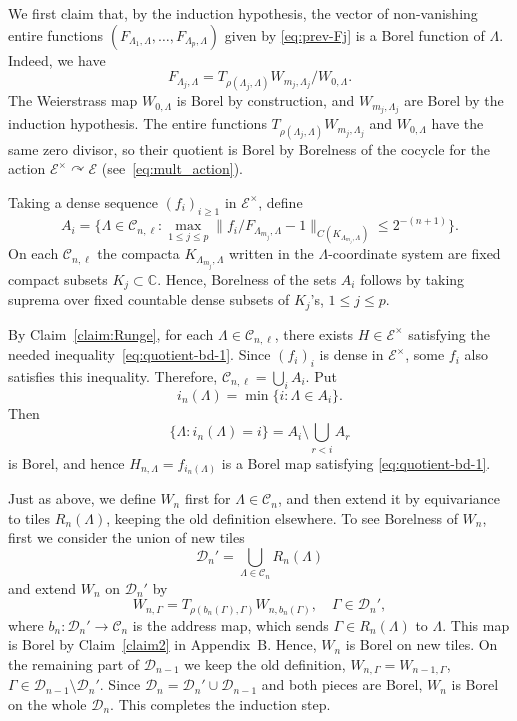 \documentclass[11pt]{paper}
\newcommand{\bC}{\mathbb C}
\newcommand{\cE}{\mathcal E}
\newcommand{\cD}{\mathcal D}
\newcommand{\cC}{\mathcal C}
\begin{document}
\smallskip

We first claim that, by the induction hypothesis, the
vector of non-vanishing entire functions
$(F_{\Lambda_1, \Lambda}, \ldots, F_{\Lambda_p,\Lambda})$ given by \eqref{eq:prev-Fj} is a Borel
function of $\Lambda$.
Indeed, we have
\[
F_{\Lambda_j, \Lambda}=T_{\rho(\Lambda_j, \Lambda)}W_{m_j,\Lambda_j}/ W_{0,\Lambda}.
\]
The Weierstrass map $W_{0,\Lambda}$ is Borel by construction, and
$W_{m_j, \Lambda_j}$ are Borel by the induction hypothesis. The entire functions
$T_{\rho(\Lambda_j, \Lambda)}W_{m_j,\Lambda_j}$ and $W_{0,\Lambda}$
have the same zero divisor, so their quotient is Borel by Borelness of the cocycle
for the action $\cE^\times \curvearrowright \cE$ (see~\eqref{eq:mult_action}).

\smallskip
Taking a dense sequence $(f_i)_{i\ge 1}$ in $\cE^\times$, define
\[
A_i = \bigl\{\Lambda\in \cC_{n, \ell}\colon
\max_{1\le j \le p} \| f_i/F_{\Lambda_{m_{j}}, \Lambda}-1\|_{C(K_{\Lambda_{m_{j}}, \Lambda})}
\le 2^{-(n+1)}
\bigr\}.
\]
On each $\cC_{n, \ell}$ the compacta $K_{\Lambda_{m_{j}}, \Lambda}$ written in the $\Lambda$-coordinate
system are fixed compact subsets $K_j\subset \bC$. Hence, Borelness of the sets $A_i$ follows by taking
suprema over fixed countable dense subsets of $K_j$'s, $1\le j \le p$.

By Claim~\ref{claim:Runge}, for each $\Lambda\in\cC_{n, \ell}$, there exists $H\in\cE^\times$
satisfying the needed inequality~\eqref{eq:quotient-bd-1}. Since $(f_i)_{i}$ is dense in $\cE^\times$,
some $f_i$ also satisfies this inequality. Therefore, $\cC_{n, \ell} = \bigcup_i A_i$. Put
\[
i_n(\Lambda) = \min\{ i\colon \Lambda\in A_i \}.
\]
Then
\[
\{ \Lambda\colon i_n(\Lambda)=i \} = A_i \setminus \bigcup_{r<i} A_r
\]
is Borel, and hence $H_{n,\Lambda}=f_{i_n(\Lambda)}$ is a Borel map
satisfying \eqref{eq:quotient-bd-1}.

Just as above, we define $W_n$ first for $\Lambda\in\cC_n$, and then extend it
by equivariance to tiles $R_n(\Lambda)$, keeping the old definition elsewhere.
To see Borelness of $W_n$, first we consider the union of new tiles
\[
\cD_n' = \bigcup_{\Lambda\in\cC_n} R_n(\Lambda)
\]
and extend $W_n$ on $\cD_n'$ by
\[
W_{n, \Gamma} = T_{\rho (b_n(\Gamma), \Gamma)} W_{n, b_n(\Gamma)},
\quad \Gamma\in \cD_n',
\]
where $b_n\colon \cD_n'\to \cC_n$ is the address map, which sends $\Gamma\in R_n(\Lambda)$
to $\Lambda$. This map is Borel by Claim~\ref{claim2} in Appendix~B. Hence,
$W_n$ is Borel on new tiles. On the remaining part of $\cD_{n-1}$ we keep the old definition,
$W_{n, \Gamma} = W_{n-1, \Gamma}$, $\Gamma\in \cD_{n-1}\setminus \cD_n'$.
Since $\cD_n = \cD_n' \cup \cD_{n-1}$ and both pieces are Borel,  $W_n$ is Borel on the
whole $\cD_n$. This completes the induction step.
\end{document}
